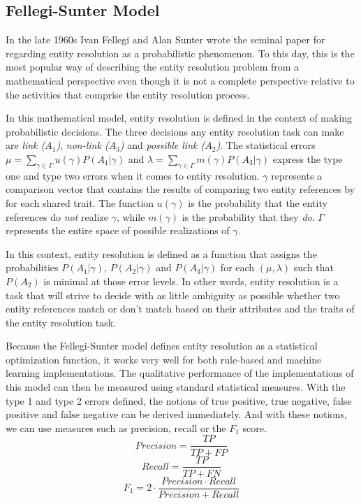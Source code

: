 \documentclass[11pt]{article}
\begin{document}
    \subsection[fsm]{Fellegi-Sunter Model}\label{subsec:fsm}

    In the late 1960s Ivan Fellegi and Alan Sunter wrote the seminal
    paper\cite{fs1969} for regarding entity resolution as a probabilistic
    phenomenon.
    To this day, this is the most popular way of describing the entity
    resolution problem from a mathematical perspective even though it is not
    a complete perspective relative to the activities that comprise the entity
    resolution process.

    In this mathematical model, entity resolution is defined in the context of
    making probabilistic decisions.
    The three decisions any entity resolution task can make are
    \textit{link ($A_1$)}, \textit{non-link ($A_3$)} and
    \textit{possible link ($A_2$)}.
    The statistical errors
    $\mu=\sum_{\gamma \in \varGamma}u(\gamma)P(A_1|\gamma)$ and
    $\lambda=\sum_{\gamma \in \varGamma}m(\gamma)P(A_3|\gamma)$ express the type
    one and type two errors when it comes to entity resolution.
    $\gamma$ represents a comparison vector that contains the results of
    comparing two entity references by for each shared trait. The function
    $u(\gamma)$ is the probability that the entity references do \textit{not}
    realize $\gamma$, while $m(\gamma)$ is the probability that they \textit{do}.
    $\varGamma$ represents the entire space of possible realizations of $\gamma$.

    In this context, entity resolution is defined as a function that assigns the
    probabilities $P(A_1|\gamma)$, $P(A_2|\gamma)$ and $P(A_3|\gamma)$ for each
    $(\mu, \lambda)$ such that $P(A_2)$ is minimal at those error levels.
    In other words, entity resolution is a task that will strive to decide with
    as little ambiguity as possible whether two entity references match or don't
    match based on their attributes and the traits of the entity resolution
    task.

    Because the Fellegi-Sunter model defines entity resolution as a statistical
    optimization function, it works very well for both
    rule-based\cite{oyster2012} and machine learning\cite{deepm2020}
    implementations.
    The qualitative performance of the implementations of this model can then be
    measured using standard statistical measures.
    With the type 1 and type 2 errors defined, the notions of true positive,
    true negative, false positive and false negative can be derived immediately.
    And with these notions, we can use measures such as precision, recall or
    the $F_1$ score.
    $$Precision=\frac{TP}{TP+FP}$$
    $$Recall=\frac{TP}{TP+FN}$$
    $$F_1=2 \cdot \frac{Precision \cdot Recall}{Precision+Recall}$$
\end{document}
